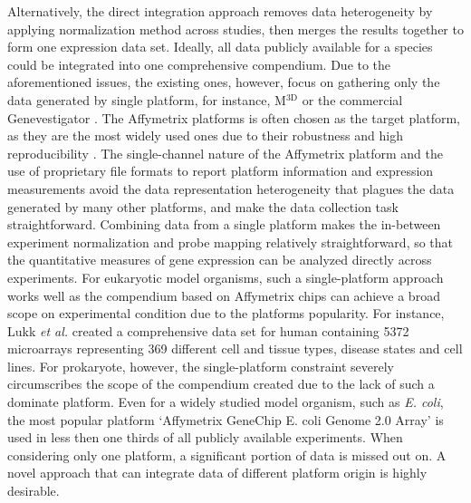 Alternatively, the direct integration approach removes data heterogeneity by
applying normalization method across studies, then merges the results together
to form one expression data set.
%
Ideally, all data publicly available for a species could be integrated into
one comprehensive compendium.
%
Due to the aforementioned issues, the existing ones, however, focus on gathering
only the data generated by single platform, for instance, M$^{\textrm{3D}}$
\cite{Faith2008} or the commercial Genevestigator \cite{Hruz2008}.
%
The Affymetrix platforms is often chosen as the target platform, as they are the
most widely used ones due to their robustness and high reproducibility
\cite{Bammler2005, Irizarry2005}.
%
The single-channel nature of the Affymetrix platform and the use of proprietary
file formats to report platform information and expression measurements avoid
the data representation heterogeneity that plagues the data generated by many
other platforms, and make the data collection task straightforward.
%
Combining data from a single platform makes the in-between experiment
normalization and probe mapping relatively straightforward, so that the
quantitative measures of gene expression can be analyzed directly across
experiments.
%
%
For eukaryotic model organisms, such a single-platform approach works well as
the compendium based on Affymetrix chips can achieve a broad scope on
experimental condition due to the platforms popularity.
%
For instance, Lukk \textit{et al.} \cite{Lukk2010} created a comprehensive data
set for human containing 5372 microarrays representing 369 different cell and
tissue types, disease states and cell lines.
%
For prokaryote, however, the single-platform constraint severely circumscribes
the scope of the compendium created due to the lack of such a dominate platform.
%
Even for a widely studied model organism, such as {\it E. coli}, the most 
popular platform `Affymetrix GeneChip E. coli Genome 2.0 Array' is used in less 
then one thirds of all publicly available experiments.
%
When considering only one platform, a significant portion of data is missed out 
on.  A novel approach that can integrate data of different platform origin is 
highly desirable.



